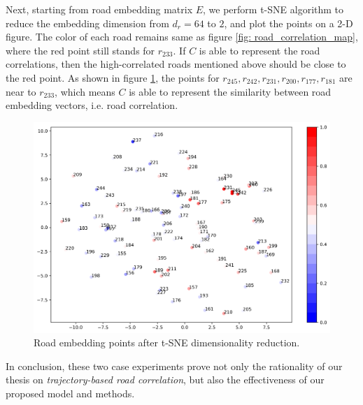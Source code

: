 Next, starting from road embedding matrix $E$, we perform t-SNE\cite{tsne} algorithm to reduce the embedding dimension from $d_r=64$ to $2$, and plot the points on a 2-D figure. The color of each road remains same as figure \ref{fig: road_correlation_map}, where the red point still stands for $r_{233}$. If $C$ is able to represent the road correlations, then the high-correlated roads mentioned above should be close to the red point. As shown in figure \ref{fig: road_correlation_tsne}, the points for $r_{245}, r_{242}, r_{231}, r_{200}, r_{177}, r_{181}$ are near to $r_{233}$, which means $C$ is able to represent the similarity between road embedding vectors, i.e. road correlation.
\begin{figure}[htb]
    \centering
    \includegraphics[width=\textwidth]{images/road_tsne.png}
    \caption{Road embedding points after t-SNE dimensionality reduction.}
    \label{fig: road_correlation_tsne}
\end{figure}

In conclusion, these two case experiments prove not only the rationality of our thesis on \textit{trajectory-based road correlation}, but also the effectiveness of our proposed model and methods.
